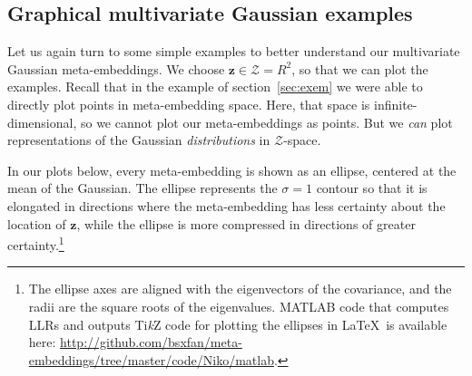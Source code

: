 \documentclass[a4paper,oneside,12pt,english]{report}
\def\zvec{\mathbf{z}}
\def\ND{\mathcal{N}}
\def\expv#1#2{\bigl\langle#1\bigr\rangle_{#2}}
\def\R{\mathbb{R}}
\def\Zset{\mathcal{Z}}
\def\Bmat{\mathbf{B}}
\def\avec{\mathbf{a}}
\def\Zset{\mathcal{Z}}
\def\dot#1#2{\expv{#1,#2}{}}
\def\normal#1{\overline{#1}}
\def\dotn#1#2{\dot{\normal{#1}}{\normal{#2}}}
\begin{document}
%

\subsection{Graphical multivariate Gaussian examples}
Let us again turn to some simple examples to better understand our multivariate Gaussian meta-embeddings. We choose $\zvec\in\Zset=R^2$, so that we can plot the examples. Recall that in the example of section~\ref{sec:exem} we were able to directly plot points in meta-embedding space. Here, that space is infinite-dimensional, so we cannot plot our meta-embeddings as points. But we \emph{can} plot representations of the Gaussian \emph{distributions} in $\Zset$-space. 

In our plots below, every meta-embedding is shown as an ellipse, centered at the mean of the Gaussian. The ellipse represents the $\sigma=1$ contour so that it is elongated in directions where the meta-embedding has less certainty about the location of $\zvec$, while the ellipse is more compressed in directions of greater certainty.\footnote{The ellipse axes are aligned with the eigenvectors of the covariance, and the radii are the square roots of the eigenvalues. MATLAB code that computes LLRs and outputs Ti\emph{k}Z code for plotting the ellipses in \LaTeX~is available here: \url{http://github.com/bsxfan/meta-embeddings/tree/master/code/Niko/matlab}.}
\end{document}
